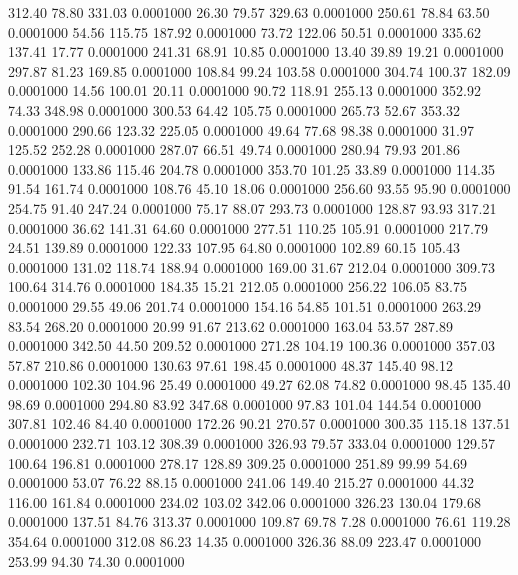  312.40   78.80  331.03   0.0001000
  26.30   79.57  329.63   0.0001000
 250.61   78.84   63.50   0.0001000
  54.56  115.75  187.92   0.0001000
  73.72  122.06   50.51   0.0001000
 335.62  137.41   17.77   0.0001000
 241.31   68.91   10.85   0.0001000
  13.40   39.89   19.21   0.0001000
 297.87   81.23  169.85   0.0001000
 108.84   99.24  103.58   0.0001000
 304.74  100.37  182.09   0.0001000
  14.56  100.01   20.11   0.0001000
  90.72  118.91  255.13   0.0001000
 352.92   74.33  348.98   0.0001000
 300.53   64.42  105.75   0.0001000
 265.73   52.67  353.32   0.0001000
 290.66  123.32  225.05   0.0001000
  49.64   77.68   98.38   0.0001000
  31.97  125.52  252.28   0.0001000
 287.07   66.51   49.74   0.0001000
 280.94   79.93  201.86   0.0001000
 133.86  115.46  204.78   0.0001000
 353.70  101.25   33.89   0.0001000
 114.35   91.54  161.74   0.0001000
 108.76   45.10   18.06   0.0001000
 256.60   93.55   95.90   0.0001000
 254.75   91.40  247.24   0.0001000
  75.17   88.07  293.73   0.0001000
 128.87   93.93  317.21   0.0001000
  36.62  141.31   64.60   0.0001000
 277.51  110.25  105.91   0.0001000
 217.79   24.51  139.89   0.0001000
 122.33  107.95   64.80   0.0001000
 102.89   60.15  105.43   0.0001000
 131.02  118.74  188.94   0.0001000
 169.00   31.67  212.04   0.0001000
 309.73  100.64  314.76   0.0001000
 184.35   15.21  212.05   0.0001000
 256.22  106.05   83.75   0.0001000
  29.55   49.06  201.74   0.0001000
 154.16   54.85  101.51   0.0001000
 263.29   83.54  268.20   0.0001000
  20.99   91.67  213.62   0.0001000
 163.04   53.57  287.89   0.0001000
 342.50   44.50  209.52   0.0001000
 271.28  104.19  100.36   0.0001000
 357.03   57.87  210.86   0.0001000
 130.63   97.61  198.45   0.0001000
  48.37  145.40   98.12   0.0001000
 102.30  104.96   25.49   0.0001000
  49.27   62.08   74.82   0.0001000
  98.45  135.40   98.69   0.0001000
 294.80   83.92  347.68   0.0001000
  97.83  101.04  144.54   0.0001000
 307.81  102.46   84.40   0.0001000
 172.26   90.21  270.57   0.0001000
 300.35  115.18  137.51   0.0001000
 232.71  103.12  308.39   0.0001000
 326.93   79.57  333.04   0.0001000
 129.57  100.64  196.81   0.0001000
 278.17  128.89  309.25   0.0001000
 251.89   99.99   54.69   0.0001000
  53.07   76.22   88.15   0.0001000
 241.06  149.40  215.27   0.0001000
  44.32  116.00  161.84   0.0001000
 234.02  103.02  342.06   0.0001000
 326.23  130.04  179.68   0.0001000
 137.51   84.76  313.37   0.0001000
 109.87   69.78    7.28   0.0001000
  76.61  119.28  354.64   0.0001000
 312.08   86.23   14.35   0.0001000
 326.36   88.09  223.47   0.0001000
 253.99   94.30   74.30   0.0001000
